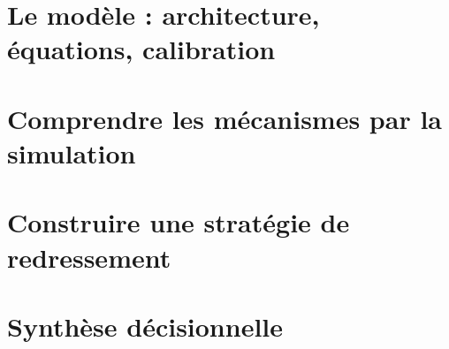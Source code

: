 \documentclass[11pt,a4paper,twoside,openany]{book}
\begin{document}
\frontmatter

\tableofcontents


\mainmatter
\part{Le modèle : architecture, équations, calibration}




\part{Comprendre les mécanismes par la simulation}




\part{Construire une stratégie de redressement}


\part{Synthèse décisionnelle}


\appendix

\backmatter

\end{document}
